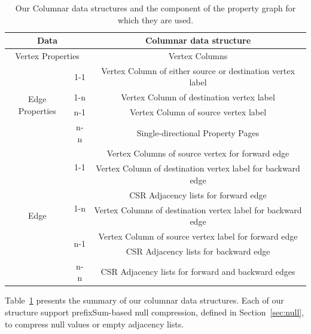 \begin{table}[t!]
	\centering
	\bgroup
	\setlength{\tabcolsep}{10pt}
	\def\arraystretch{1.3}%
	\begin{tabular}{ |c|c|c| } 
		\hline
		\multicolumn{2}{|c|}{\textbf{Data}} & \textbf{Columnar data structure} \\
		\hline \hline
		\multicolumn{2}{|c|}{Vertex Properties} & Vertex Columns \\
		\hline \hline
		\multirow{4}{60pt}{Edge Properties} & 1-1 & Vertex Column of either source or destination vertex label\\
		\cline{2-3}
		& 1-n & Vertex Column of destination vertex label\\
		\cline{2-3}
		& n-1 & Vertex Column of source vertex label\\
		\cline{2-3}
		& n-n & Single-directional Property Pages \\
		\hline \hline
		\multirow{7}{60pt}{Edge} & \multirow{2}{20pt}{1-1} & Vertex Columns of source vertex for forward edge \\
		&& Vertex Column of destination vertex label for backward edge \\
		\cline{2-3}
		& \multirow{2}{20pt}{1-n} & CSR Adjacency lists for forward edge \\
		&& Vertex Columns of destination vertex label for backward edge \\
		\cline{2-3}
		& \multirow{2}{20pt}{n-1} & Vertex Column of source vertex label for forward edge \\
		&& CSR Adjacency lists for backward edge \\
		\cline{2-3}
		& \multirow{1}{20pt}{n-n} & CSR Adjacency lists for forward and backward edges \\
		\hline
	\end{tabular}
	\egroup
	\captionsetup{justification=centering}
	\caption{Our Columnar data structures and the component of the property graph for which they are used.}
	\label{tbl:summ}
\end{table}

Table~\ref{tbl:summ} presents the summary of our columnar data structures. Each of our structure support prefixSum-based null compression, defined in Section~\ref{sec:null}, to compress null values or empty adjacency lists.
